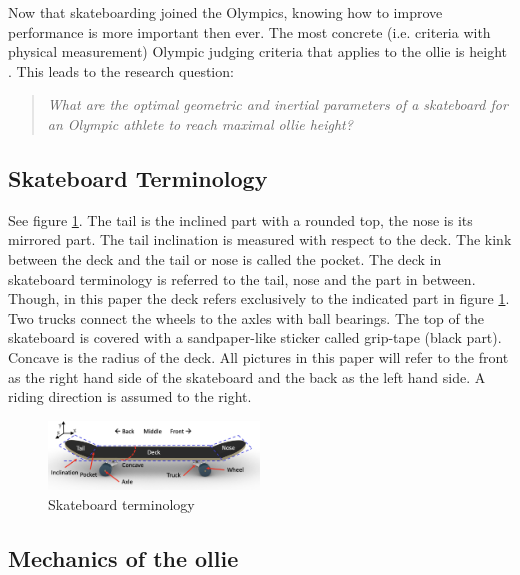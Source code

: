 \documentclass[default,iicol]{sn-jnl}
\begin{document}
Now that skateboarding joined the Olympics, knowing how to improve performance
is more important then ever. The most concrete (i.e. criteria with physical
measurement) Olympic judging criteria that applies to the ollie is height
\cite{world_skate_skateboarding_2021}. This leads to the research question:
\begin{quote}
\textit{
    What are the optimal geometric and inertial parameters of a skateboard for an Olympic athlete to reach maximal ollie height?}
\end{quote}

\subsection{Skateboard Terminology}
See figure \ref{f_skateterminology}. The tail is the inclined part with a rounded top, the nose is its mirrored part. The tail inclination is measured with respect to the deck. The kink between the deck and the tail or nose is called the pocket. The deck in skateboard terminology is referred to the tail, nose and the part in between. Though, in this paper the deck refers exclusively to the indicated part in figure \ref{f_skateterminology}. Two trucks connect the wheels to the axles with ball bearings. The top of the skateboard is covered with a sandpaper-like sticker called grip-tape (black part). Concave is the radius of the deck. All pictures in this paper will refer to the front as the right hand side of the skateboard and the back as the left hand side. A riding direction is assumed to the right.

\begin{figure}[t]
\includegraphics[width=0.5\textwidth]{figure/terminology.png}
\caption[Skateboard terminology]{Skateboard terminology}
\label{f_skateterminology}
\end{figure}

\subsection{Mechanics of the ollie} \label{ss_mechanics}
\end{document}
